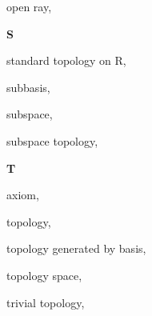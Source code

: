 \begin{multicols}{2}
\hspace{2em}open ray, \pageref{def:Ray}

\vspace{1em}\large{\textbf{S}}

standard topology on R, \pageref{def:StandardTopologyOnTheRealLine}

subbasis, \pageref{def:Subbasis}

subspace, \pageref{def:SubspaceTopology}

subspace topology, \pageref{def:SubspaceTopology}

\vspace{1em}\large{\textbf{T}}

 axiom, \pageref{def:T1Axiom}

topology, \pageref{def:Topology}

topology generated by basis, \pageref{def:TopologyGeneratedByBasis}

topology space, \pageref{def:TopologySpace}

trivial topology, \pageref{def:TrivialTopology}

\end{multicols}